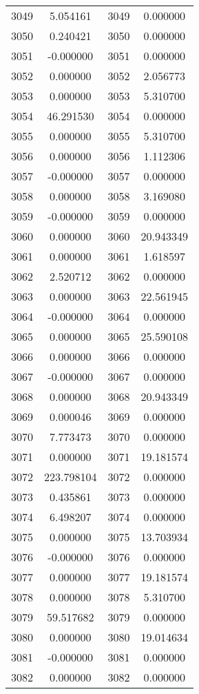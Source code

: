 \documentclass[12pt]{article}
\begin{document}
\begin{longtable}{@{}cccc@{}}
3049 & 5.054161 & 3049 & 0.000000 \\
3050 & 0.240421 & 3050 & 0.000000 \\
3051 & -0.000000 & 3051 & 0.000000 \\
3052 & 0.000000 & 3052 & 2.056773 \\
3053 & 0.000000 & 3053 & 5.310700 \\
3054 & 46.291530 & 3054 & 0.000000 \\
3055 & 0.000000 & 3055 & 5.310700 \\
3056 & 0.000000 & 3056 & 1.112306 \\
3057 & -0.000000 & 3057 & 0.000000 \\
3058 & 0.000000 & 3058 & 3.169080 \\
3059 & -0.000000 & 3059 & 0.000000 \\
3060 & 0.000000 & 3060 & 20.943349 \\
3061 & 0.000000 & 3061 & 1.618597 \\
3062 & 2.520712 & 3062 & 0.000000 \\
3063 & 0.000000 & 3063 & 22.561945 \\
3064 & -0.000000 & 3064 & 0.000000 \\
3065 & 0.000000 & 3065 & 25.590108 \\
3066 & 0.000000 & 3066 & 0.000000 \\
3067 & -0.000000 & 3067 & 0.000000 \\
3068 & 0.000000 & 3068 & 20.943349 \\
3069 & 0.000046 & 3069 & 0.000000 \\
3070 & 7.773473 & 3070 & 0.000000 \\
3071 & 0.000000 & 3071 & 19.181574 \\
3072 & 223.798104 & 3072 & 0.000000 \\
3073 & 0.435861 & 3073 & 0.000000 \\
3074 & 6.498207 & 3074 & 0.000000 \\
3075 & 0.000000 & 3075 & 13.703934 \\
3076 & -0.000000 & 3076 & 0.000000 \\
3077 & 0.000000 & 3077 & 19.181574 \\
3078 & 0.000000 & 3078 & 5.310700 \\
3079 & 59.517682 & 3079 & 0.000000 \\
3080 & 0.000000 & 3080 & 19.014634 \\
3081 & -0.000000 & 3081 & 0.000000 \\
3082 & 0.000000 & 3082 & 0.000000 \\

\end{longtable}
\end{document}
